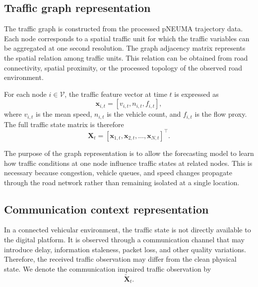 \documentclass[pdflatex,sn-mathphys-num]{sn-jnl}%
\theoremstyle{thmstyleone}%
\theoremstyle{thmstyletwo}%
\theoremstyle{thmstylethree}%
\begin{document}
\subsection{Traffic graph representation}

The traffic graph is constructed from the processed pNEUMA trajectory data. Each node corresponds to a spatial traffic unit for which the traffic variables can be aggregated at one second resolution. The graph adjacency matrix represents the spatial relation among traffic units. This relation can be obtained from road connectivity, spatial proximity, or the processed topology of the observed road environment.

For each node \(i\in\mathcal{V}\), the traffic feature vector at time \(t\) is expressed as
\begin{equation}
    \mathbf{x}_{i,t}
    =
    \left[
    v_{i,t},
    n_{i,t},
    f_{i,t}
    \right],
\end{equation}
where \(v_{i,t}\) is the mean speed, \(n_{i,t}\) is the vehicle count, and \(f_{i,t}\) is the flow proxy. The full traffic state matrix is therefore
\begin{equation}
    \mathbf{X}_{t}
    =
    \left[
    \mathbf{x}_{1,t},
    \mathbf{x}_{2,t},
    \ldots,
    \mathbf{x}_{N,t}
    \right]^{\top}.
\end{equation}

The purpose of the graph representation is to allow the forecasting model to learn how traffic conditions at one node influence traffic states at related nodes. This is necessary because congestion, vehicle queues, and speed changes propagate through the road network rather than remaining isolated at a single location.

\subsection{Communication context representation}

In a connected vehicular environment, the traffic state is not directly available to the digital platform. It is observed through a communication channel that may introduce delay, information staleness, packet loss, and other quality variations. Therefore, the received traffic observation may differ from the clean physical state. We denote the communication impaired traffic observation by
\begin{equation}
    \widetilde{\mathbf{X}}_{t}.
\end{equation}
\end{document}
